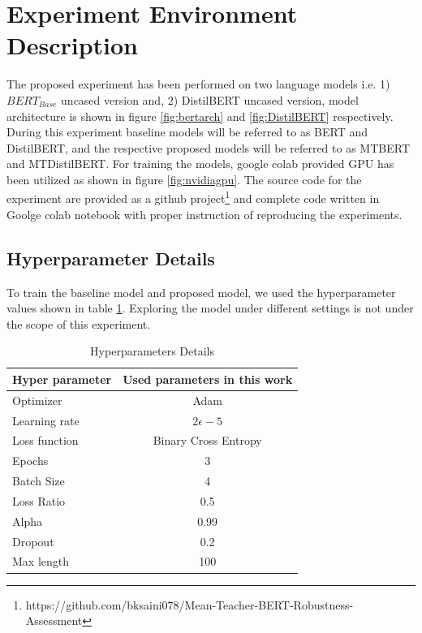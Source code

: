 \documentclass[%
	BCOR=8mm, %
	DIV=12,
	toc=bibliography, %
	toc=listof, %
	oneside, %
	egregdoesnotlikesansseriftitles, %
	]{scrbook}
\begin{document}
\section{Experiment Environment Description}
\label{section: experimentenv}
The proposed experiment has been performed on two language models i.e. 1) $BERT_{Base}$ uncased version  and, 2) DistilBERT uncased version, model architecture is shown in figure \ref{fig:bertarch} and \ref{fig:DistilBERT} respectively. During this experiment baseline models will be referred to as BERT and DistilBERT, and the respective proposed models will be referred to as MTBERT and MTDistilBERT. For training the models, google colab provided GPU has been utilized as shown in figure \ref{fig:nvidiagpu}. The source code for the experiment are provided as a github project\footnote{https://github.com/bksaini078/Mean-Teacher-BERT-Robustness-Assessment} and complete code written in Goolge colab notebook with proper instruction of reproducing the experiments.
\subsection{Hyperparameter Details}
\label{subsection:hyperparameter}
To train the baseline model and proposed model, we used the hyperparameter values shown in table \ref{table:HyperparameterTable}. Exploring the model under different settings is not under the scope of this experiment. 
\begin{table}[H]
\centering
\begin{tabular}{ l c | c | }
\hline
Hyper parameter 		& \multicolumn{2}{c}{Used parameters in this work}\\
\hline
Optimizer 				& \multicolumn{2}{c}{Adam} \\
Learning rate 			& \multicolumn{2}{c}{ $2\epsilon -5$ } \\
Loss function 			& \multicolumn{2}{c}{Binary Cross Entropy}  \\
Epochs 				& \multicolumn{2}{c}{$3$} \\
Batch Size 			& \multicolumn{2}{c}{4 } \\
Loss Ratio 			&\multicolumn{2}{c}{0.5}\\
Alpha 			&\multicolumn{2}{c}{0.99}\\
Dropout  			& \multicolumn{2}{c}{0.2}  \\
Max length 			 & \multicolumn{2}{c}{100}  \\
\hline
\end{tabular}
\caption[Details of hyperparameters details]{Hyperparameters Details}
\label{table:HyperparameterTable}
\end{table}
\end{document}
